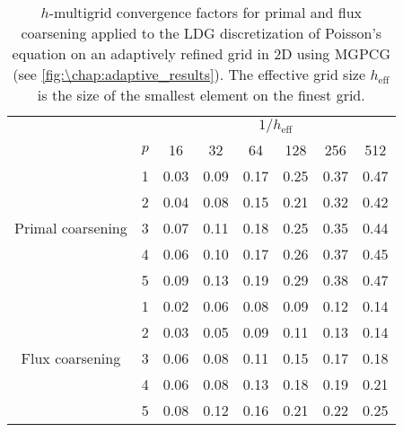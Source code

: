 \begin{table}[htb]
\caption{$h$-multigrid convergence factors for primal and flux coarsening applied to the LDG discretization of Poisson's equation on an adaptively refined grid in 2D using MGPCG (see \cref{fig:\chap:adaptive_results}). The effective grid size $h_\text{eff}$ is the size of the smallest element on the finest grid.\vspace{-1.8em}}
\label{tab:2D_adaptive}
\centering
\small
\begin{tabular}{@{}cl@{\qquad}cccccc@{}}
&&&&&&& \\ \midrule
&& \multicolumn{6}{c}{$1/h_\text{eff}$} \\
& $p$ & 16 & 32 & 64 & 128 & 256 & 512 \\ \cmidrule{1-8}
\multirow{5}{*}{Primal coarsening}
& 1 & 0.03 & 0.09 & 0.17 & 0.25 & 0.37 & 0.47 \\ 
& 2 & 0.04 & 0.08 & 0.15 & 0.21 & 0.32 & 0.42 \\ 
& 3 & 0.07 & 0.11 & 0.18 & 0.25 & 0.35 & 0.44 \\ 
& 4 & 0.06 & 0.10 & 0.17 & 0.26 & 0.37 & 0.45 \\ 
& 5 & 0.09 & 0.13 & 0.19 & 0.29 & 0.38 & 0.47 \\ \cmidrule{1-8}
\multirow{5}{*}{Flux coarsening}
& 1 & 0.02 & 0.06 & 0.08 & 0.09 & 0.12 & 0.14 \\ 
& 2 & 0.03 & 0.05 & 0.09 & 0.11 & 0.13 & 0.14 \\ 
& 3 & 0.06 & 0.08 & 0.11 & 0.15 & 0.17 & 0.18 \\ 
& 4 & 0.06 & 0.08 & 0.13 & 0.18 & 0.19 & 0.21 \\ 
& 5 & 0.08 & 0.12 & 0.16 & 0.21 & 0.22 & 0.25 \\ \midrule
\end{tabular}
\end{table}

